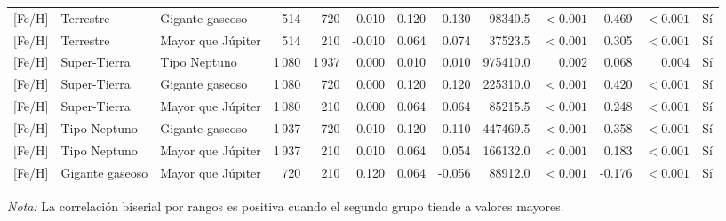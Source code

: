 \begin{table}[htbp]
{\begin{tabular}{lllrrrrrrrrrr}
    {[Fe/H]} & Terrestre & Gigante gaseoso & 514 & 720 & -0.010 & 0.120 & 0.130 & 98340.5 & $<0.001$ & 0.469 & $<0.001$ & Sí \\
    {[Fe/H]} & Terrestre & Mayor que Júpiter & 514 & 210 & -0.010 & 0.064 & 0.074 & 37523.5 & $<0.001$ & 0.305 & $<0.001$ & Sí \\
    {[Fe/H]} & Super-Tierra & Tipo Neptuno & 1\,080 & 1\,937 & 0.000 & 0.010 & 0.010 & 975410.0 & 0.002 & 0.068 & 0.004 & Sí \\
    {[Fe/H]} & Super-Tierra & Gigante gaseoso & 1\,080 & 720 & 0.000 & 0.120 & 0.120 & 225310.0 & $<0.001$ & 0.420 & $<0.001$ & Sí \\
    {[Fe/H]} & Super-Tierra & Mayor que Júpiter & 1\,080 & 210 & 0.000 & 0.064 & 0.064 & 85215.5 & $<0.001$ & 0.248 & $<0.001$ & Sí \\
    {[Fe/H]} & Tipo Neptuno & Gigante gaseoso & 1\,937 & 720 & 0.010 & 0.120 & 0.110 & 447469.5 & $<0.001$ & 0.358 & $<0.001$ & Sí \\
    {[Fe/H]} & Tipo Neptuno & Mayor que Júpiter & 1\,937 & 210 & 0.010 & 0.064 & 0.054 & 166132.0 & $<0.001$ & 0.183 & $<0.001$ & Sí \\
    {[Fe/H]} & Gigante gaseoso & Mayor que Júpiter & 720 & 210 & 0.120 & 0.064 & -0.056 & 88912.0 & $<0.001$ & -0.176 & $<0.001$ & Sí \\
    \bottomrule
    \end{tabular}
    }
    \par\smallskip
    {\footnotesize\textit{Nota:} La correlación biserial por rangos es positiva cuando el segundo grupo tiende a valores mayores.}
\end{table}
